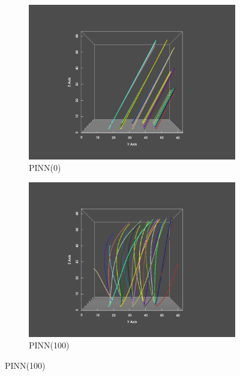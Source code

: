 \begin{figure}
  \begin{subfigure}{.5\linewidth}
    \centering
    \caption{PINN(0)}\label{fig:yz0}
    \includegraphics[trim={6cm 1cm 6cm 2cm}, clip, width=\linewidth]{"img/PINN_000000_yz.pdf"}
  \end{subfigure}%
  \begin{subfigure}{.5\linewidth}
    \centering
    \caption{PINN(100)}
    \includegraphics[trim={6cm 1cm 6cm 2cm}, clip, width=\linewidth]{"img/PINN_000100_yz.pdf"}
  \end{subfigure}


\end{figure}
